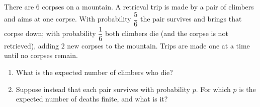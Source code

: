 There are $6$ corpses on a mountain. A retrieval trip is made by a pair of climbers and aims at one corpse. With probability $\dfrac56$ the pair survives and brings that corpse down; with probability $\dfrac16$ both climbers die (and the corpse is not retrieved), adding $2$ new corpses to the mountain. Trips are made one at a time until no corpses remain.
\begin{enumerate}
\item[(a)] What is the expected number of climbers who die?
\item[(b)] Suppose instead that each pair survives with probability $p$. For which $p$ is the expected number of deaths finite, and what is it?
\end{enumerate}
